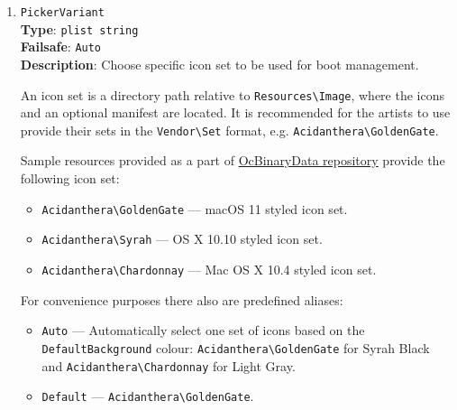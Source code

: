 \documentclass[]{article}
\providecommand{\tightlist}{%
  \setlength{\itemsep}{0pt}\setlength{\parskip}{0pt}}
\begin{document}
\begin{enumerate}
  \emph{Note 3}: On Macs with problematic GOP, it may be difficult to re-bless OpenCore if its bless status
  is lost. The \texttt{BootKicker} utility can be used to work around this problem, if set up as a Tool
  in OpenCore with \texttt{FullNvramAccess} enabled. It will launch the Apple picker,
  which allows selection of an item to boot next (with \texttt{Enter}), or next and from then on until
  the next change (with \texttt{CTRL+Enter}). Note that after the selection is made, the system
  \emph{will reboot} before the chosen entry is booted. While this behaviour might seem surprising,
  it can be used both to switch which OpenCore installation is blessed, with \texttt{CTRL+Enter},
  e.g. from a recovery OpenCore installation on CD (selected with the \texttt{C} key on boot) back
  to the main installion of OpenCore on the hard drive, if this is lost after an NVRAM reset. It can
  also be used, even when the native picker cannot be shown normally (unsupported GPU), to do a one-shot
  boot without OpenCore, e.g. to another OS or tool, or to an earlier version of macOS.

\item
  \texttt{PickerVariant}\\
  \textbf{Type}: \texttt{plist\ string}\\
  \textbf{Failsafe}: \texttt{Auto}\\
  \textbf{Description}: Choose specific icon set to be used for boot management.

  An icon set is a directory path relative to \texttt{Resources\textbackslash Image},
  where the icons and an optional manifest are located. It is recommended for
  the artists to use provide their sets in the \texttt{Vendor\textbackslash Set} format,
  e.g. \texttt{Acidanthera\textbackslash GoldenGate}.

  Sample resources provided as a part of
  \href{https://github.com/acidanthera/OcBinaryData}{OcBinaryData repository}
  provide the following icon set:
  \begin{itemize}
    \tightlist
    \item \texttt{Acidanthera\textbackslash GoldenGate} --- macOS 11 styled icon set.
    \item \texttt{Acidanthera\textbackslash Syrah} --- OS X 10.10 styled icon set.
    \item \texttt{Acidanthera\textbackslash Chardonnay} --- Mac OS X 10.4 styled icon set.
  \end{itemize}

  For convenience purposes there also are predefined aliases:
  \begin{itemize}
    \tightlist
    \item \texttt{Auto} --- Automatically select one set of icons based on the \texttt{DefaultBackground}
      colour: \texttt{Acidanthera\textbackslash GoldenGate} for Syrah Black and
      \texttt{Acidanthera\textbackslash Chardonnay} for Light Gray.
    \item \texttt{Default} --- \texttt{Acidanthera\textbackslash GoldenGate}.
  \end{itemize}


\end{enumerate}
\end{document}

